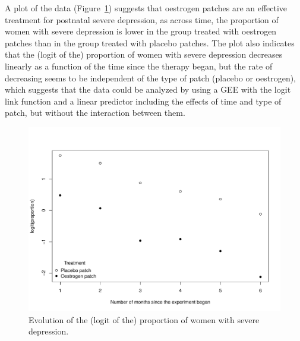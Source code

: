 A plot of the data (Figure~\ref{depression0}) suggests that oestrogen patches are an effective treatment for postnatal severe depression, as across time, the proportion of women with severe depression is lower in the group treated with oestrogen patches than in the group treated with placebo patches. The plot also indicates that the (logit of the) proportion of women with severe depression decreases linearly as a function of the time since the therapy began, but the rate of decreasing seems to be independent of the type of patch (placebo or oestrogen), which suggests that the data could be analyzed by using a GEE with the logit link function and a linear predictor including the effects of time and type of patch, but without the interaction between them.

\begin{figure}[h!]
\centering
\includegraphics[width=\textwidth]{depression1}
\caption{Evolution of the (logit of the) proportion of women with severe depression.}
\label{depression0}
\end{figure}


